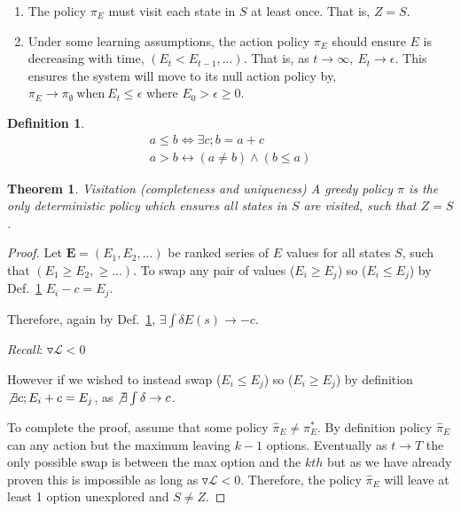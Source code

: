 \documentclass[9pt,twocolumn,twoside]{pnas-new}
\newtheorem{theorem}{Theorem}
\newtheorem{definition}{Definition}
\begin{document}
\begin{enumerate}[noitemsep,wide=0pt,leftmargin=\dimexpr\labelwidth+2\labelsep\relax]
    \item The policy $\pi_E$ must visit each state in $S$ at least once. That is, $Z = S$.
    \item Under some learning assumptions, the action policy $\pi_E$ should ensure $E$ is decreasing with time, $(E_t < E_{t-1}, ...)$. That is, as $t \rightarrow \infty,\ E_t \rightarrow \epsilon$. This ensures the system will move to its null action policy by, $\pi_E \rightarrow \pi_{\emptyset} \ \text{when} \ E_t \leq \epsilon$ where $E_0 > \epsilon \geq 0$.
\end{enumerate}

\begin{definition} \label{def:ineq}
    \begin{align}
        a \leq b \Leftrightarrow \exists c; b = a + c \\
        a > b \leftrightarrow (a \neq b) \wedge (b \leq a) 
    \end{align}
\end{definition}



\begin{theorem}{Visitation (completeness and uniqueness)} \label{theorem:Z}
A greedy policy $\pi$ is the only deterministic policy which ensures all states in $S$ are visited, such that $Z = S$.
\end{theorem}
\begin{proof}    
    Let $\textbf{E} = (E_1, E_2, ...)$ be ranked series of $E$ values for all states $S$, such that $(E_1 \geq E_2, \geq ...)$. To swap any pair of values ($E_i \geq E_j$) so ($E_i \leq E_j$) by Def.~\ref{def:ineq} $E_i - c = E_j$.  

    Therefore, again by Def.~\ref{def:ineq}, $\exists \int \delta E(s) \rightarrow -c$. 

    \textit{Recall}: $\triangledown \mathcal{L} < 0$

    However if we wished to instead swap ($E_i \leq E_j$) so ($E_i \geq E_j$) by definition $\not \exists c; E_i + c = E_j$, as $\not \exists \int \delta \rightarrow c$. 

    To complete the proof, assume that some policy $\hat \pi_E \neq \pi^*_E$. By definition policy $\hat \pi_E$ can any action but the maximum leaving $k-1$ options. Eventually as $t \rightarrow T$ the only possible swap is between the max option and the $kth$ but as we have already proven this is impossible as long as $\triangledown \mathcal{L} < 0$. Therefore, the policy $\hat \pi_E$ will leave at least 1 option unexplored and $S \neq Z$.
\end{proof}
\end{document}
